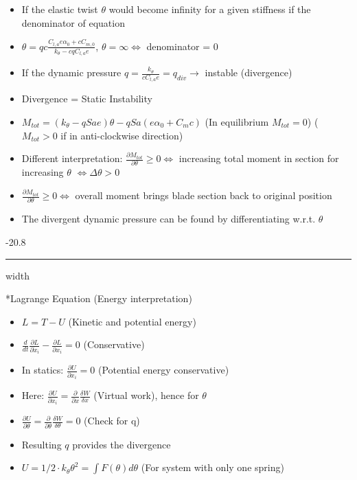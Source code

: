 \documentclass[8pt, landscape, fleqn]{scrartcl}
\makeatletter
\renewcommand{\subsubsection}{\@startsection{subsubsection}{1}{0mm}%
{-2\baselineskip}{0.8\baselineskip}%
{\hrule depth 0.2pt width\columnwidth\vspace*{1.2em}\normalsize\bfseries\rmfamily}}
\makeatother
\begin{document}
\begin{multicols*}{3}
\begin{itemize}
    \item If the elastic twist $\theta$ would become infinity for a given stiffness if the denominator of equation
    \item $\theta = qc \frac{C_{l,a} e \alpha_0 + c C_{m,0}}{k_\theta - cqC_{l,a}e}$, $\theta = \infty \Leftrightarrow$ denominator = 0
    \item If the dynamic pressure $q = \frac{k_\theta}{c C_{l,a}e} = q_{div} \rightarrow$ instable (divergence)
    \item Divergence = Static Instability
    \item $M_{tot} = (k_{\theta} -q Sae) \theta - qSa (e\alpha_0 + C_mc)$ (In equilibrium $M_{tot} = 0$) ($M_{tot} > 0$ if in anti-clockwise direction)
    \item Different interpretation: $\frac{\partial M_{tot}}{\partial \theta} \geq 0 \Leftrightarrow $ increasing total moment in section for increasing $\theta$ $ \Leftrightarrow \Delta \theta > 0$
    \item $\frac{\partial M_{tot}}{\partial \theta} \geq 0 \Leftrightarrow$ overall moment brings blade section back to original position
    \item The divergent dynamic pressure can be found by differentiating w.r.t. $\theta$ 
\end{itemize}

\subsubsection*{Lagrange Equation (Energy interpretation)}

\begin{itemize}
    \item $L = T-U$ (Kinetic and potential energy)
    \item $\frac{d}{dt}\frac{\partial L }{\partial \dot{x}_i} - \frac{\partial L}{\partial x_i} = 0$ (Conservative)
    \item In statics: $\frac{\partial U}{\partial x_i} = 0$ (Potential energy conservative)
    \item Here: $\frac{\partial U}{\partial x_i} = \frac{\partial}{\partial x}\frac{\delta W}{\delta x}$ (Virtual work), hence for $\theta$
    \item $\frac{\partial U}{\partial \theta}= \frac{\partial}{\partial \theta}\frac{\delta W}{\delta \theta} = 0$ (Check for q)
    \item Resulting $q$ provides the divergence
    \item $U = 1/2\cdot k_\theta \theta^2 = \int F(\theta) d\theta$ (For system with only one spring)
\end{itemize}


\end{multicols*}
\end{document}
